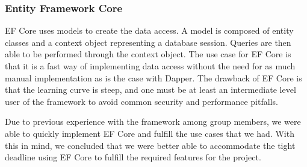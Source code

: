 \subsubsection{Entity Framework Core}

EF Core uses models to create the data access. A model is composed of entity classes and a context object representing a database session.
Queries are then able to be performed through the context object. 
The use case for EF Core is that it is a fast way of implementing data access without the need for as much manual implementation as is the case with Dapper. 
The drawback of EF Core is that the learning curve is steep, and one must be at least an intermediate level user of the framework to avoid common security and performance pitfalls\cite{EFCore}.

Due to previous experience with the framework among group members, we were able to quickly implement EF Core and fulfill the use cases that we had.
With this in mind, we concluded that we were better able to accommodate the tight deadline using EF Core to fulfill the required features for the \knox{} project.